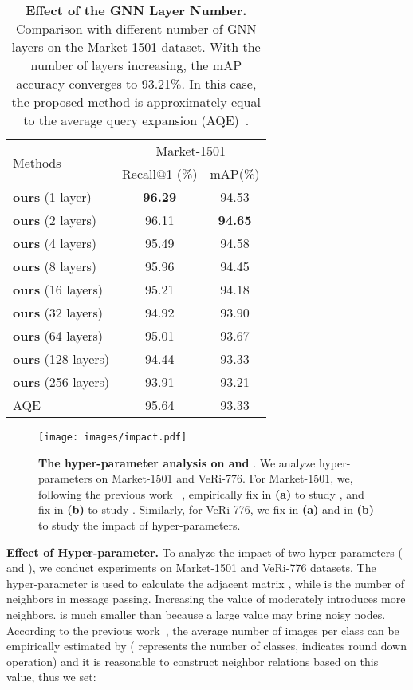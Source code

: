 \documentclass[10pt,twocolumn,letterpaper]{article}
\begin{document}
\setlength{\tabcolsep}{15pt}
\begin{table}[t]
\small
\begin{center}
\begin{tabular}{l|cc}
\toprule[1pt]
\multirow{2}{*}{Methods}&  \multicolumn{2}{c}{Market-1501} \\ 
& Recall@1 (\%)      & mAP(\%)\\ \midrule[0.5pt]
\textbf{ours} (1 layer) &\textbf{96.29 }   & 94.53   \\
\textbf{ours} (2 layers) &96.11   & \textbf{94.65} \\
\textbf{ours} (4 layers) &95.49   & 94.58 \\
\textbf{ours} (8 layers) &95.96   & 94.45 \\
\textbf{ours} (16 layers) &95.21   & 94.18 \\
\textbf{ours} (32 layers) &94.92   & 93.90 \\
\textbf{ours} (64 layers) &95.01   & 93.67 \\
\textbf{ours} (128 layers) &94.44   & 93.33 \\
\textbf{ours} (256 layers) &93.91   & 93.21 \\
AQE~\cite{chum2007total} &95.64  &93.33 \\
\bottomrule[1pt]
\end{tabular}
\end{center}
\caption{\textbf{Effect of the GNN Layer Number.} Comparison with different number of GNN layers on the Market-1501 dataset. With the number of layers increasing, the mAP accuracy converges to 93.21\%. In this case, the proposed method is approximately equal to the average query expansion (AQE)~\cite{chum2007total}.}
\label{table_layer}
\end{table}

\begin{figure}[t]
\begin{center}
   \texttt{[image: images/impact.pdf]}
\end{center}
  \caption{\textbf{The hyper-parameter analysis on  and }. We analyze hyper-parameters on Market-1501 and VeRi-776. For Market-1501, we, following the previous work ~\cite{van2020scan}, empirically fix  in \textbf{(a)} to study , and fix  in \textbf{(b)} to study . Similarly, for VeRi-776, we fix  in \textbf{(a)} and  in \textbf{(b)} to study the impact of hyper-parameters.
  }
\label{fig:k}
\end{figure}

\noindent\textbf{Effect of Hyper-parameter.}  \label{sec:hyper}
To analyze the impact of two hyper-parameters ( and ), we conduct experiments on Market-1501 and VeRi-776 datasets. The hyper-parameter  is used to calculate the adjacent matrix , while  is the number of neighbors in message passing. 
Increasing the value of  moderately introduces more neighbors.
 is much smaller than  because a large value may bring noisy nodes. 
According to the previous work~\cite{van2020scan}, the average number of images per class can be empirically estimated by  ( represents the number of classes,  indicates round down operation) and it is reasonable to construct neighbor relations based on this value, thus we set:
\end{document}

